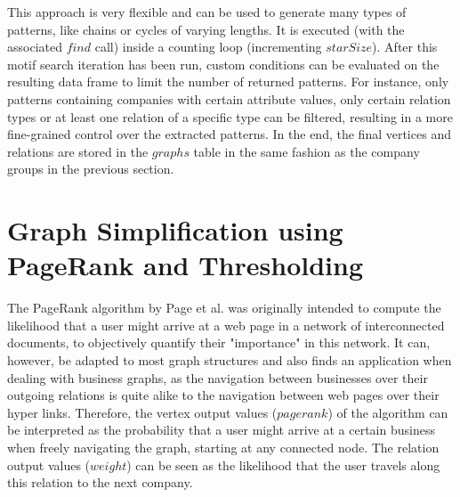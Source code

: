 \documentclass[
  a4paper,     %
  titlepage,   %
  oneside,     %
  parskip      %
]{scrartcl}          %
\begin{document}
  This approach is very flexible and can be used to generate many types of patterns,
  like chains or cycles of varying lengths. It is executed (with the associated $find$ call)
  inside a counting loop (incrementing $starSize$).
  After this motif search iteration has been run,
  custom conditions can be evaluated on the resulting data frame to limit
  the number of returned patterns. For instance, only patterns containing companies
  with certain attribute values, only certain relation types or at least
  one relation of a specific type can be filtered, resulting in a more fine-grained control
  over the extracted patterns.
  In the end, the final vertices and relations are stored in the $graphs$ table in the same
  fashion as the company groups in the previous section.

  \section{Graph Simplification using PageRank and Thresholding}
  \label{sec:graph_simplification}
  The PageRank algorithm by Page et al. \cite{pagerank1999} was originally intended
  to compute the likelihood that a user might arrive at a web page
  in a network of interconnected documents, to objectively quantify their "importance" in this network.
  It can, however, be adapted to most
  graph structures and also finds an application when dealing with business graphs,
  as the navigation between businesses over their outgoing relations is quite
  alike to the navigation between web pages over their hyper links.
  Therefore, the vertex output values ($pagerank$) of the algorithm can be interpreted as the
  probability that a user might arrive at a certain business when freely
  navigating the graph, starting at any connected node.
  The relation output values ($weight$) can be seen as the likelihood that the user
  travels along this relation to the next company.
\end{document}
